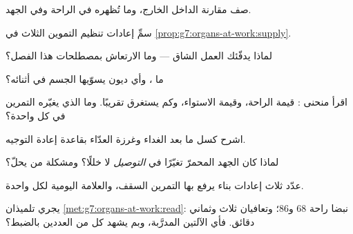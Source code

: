\begin{exercise}[$\star$]\label{exo:g7:organs-at-work:3}
صف مقارنة  الداخل  الخارج، وما تُظهره في الراحة وفي
الجهد.
\end{exercise}

\begin{exercise}[$\star$]\label{exo:g7:organs-at-work:4}
سمِّ إعادات تنظيم التموين الثلاث في
\cref{prop:g7:organs-at-work:supply}.
\end{exercise}

\begin{exercise}[$\star$]\label{exo:g7:organs-at-work:5}
لماذا يدفّئك العمل الشاق --- وما الارتعاش بمصطلحات هذا الفصل؟
\end{exercise}

\begin{exercise}[$\star$]\label{exo:g7:organs-at-work:6}
ما ، وأي ديون يسوّيها الجسم في أثنائه؟
\end{exercise}

\begin{exercise}[$\star\star$]\label{exo:g7:organs-at-work:7}
اقرأ منحنى : قيمة الراحة، وقيمة الاستواء، وكم يستغرق 
تقريبًا. وما الذي يغيّره التمرين في كل واحدة؟
\end{exercise}

\begin{exercise}[$\star\star$]\label{exo:g7:organs-at-work:8}
اشرح كسل ما بعد الغداء وغرزة العدّاء بقاعدة إعادة التوجيه.
\end{exercise}

\begin{exercise}[$\star\star$]\label{exo:g7:organs-at-work:9}
لماذا كان  الجهد المحمرّ تغيّرًا في \emph{التوصيل} لا خللًا؟
ومشكلة من يحلّ؟
\end{exercise}

\begin{exercise}[$\star\star$]\label{exo:g7:organs-at-work:10}
عدّد ثلاث إعادات بناء يرفع بها التمرين السقف، والعلامة اليومية
لكل واحدة.
\end{exercise}

\begin{exercise}[$\star\star$]\label{exo:g7:organs-at-work:11}
يجري تلميذان \cref{met:g7:organs-at-work:read}: نبضا راحة $68$
و$86$؛ وتعافيان ثلاث وثماني دقائق. فأي الآلتين المدرَّبة، وبم
يشهد كل من العددين بالضبط؟
\end{exercise}

